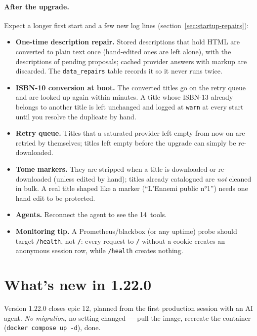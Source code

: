 \paragraph{After the upgrade.} Expect a longer first start and a few
new log lines (section~\ref{sec:startup-repairs}):
\begin{itemize}
  \item \textbf{One-time description repair.} Stored descriptions that
        hold HTML are converted to plain text once (hand-edited ones are
        left alone), with the descriptions of pending proposals; cached
        provider answers with markup are discarded. The
        \texttt{data\_repairs} table records it so it never runs twice.
  \item \textbf{ISBN-10 conversion at boot.} The converted titles go on
        the retry queue and are looked up again within minutes. A title
        whose ISBN-13 already belongs to another title is left unchanged
        and logged at \texttt{warn} at every start until you resolve the
        duplicate by hand.
  \item \textbf{Retry queue.} Titles that a saturated provider left
        empty from now on are retried by themselves; titles left empty
        before the upgrade can simply be re-downloaded.
  \item \textbf{Tome markers.} They are stripped when a title is
        downloaded or re-downloaded (unless edited by hand); titles
        already catalogued are \emph{not} cleaned in bulk. A real title
        shaped like a marker (``L'Ennemi public n°1'') needs one hand
        edit to be protected.
  \item \textbf{Agents.} Reconnect the agent to see the 14~tools.
  \item \textbf{Monitoring tip.} A Prometheus/blackbox (or any uptime)
        probe should target \texttt{/health}, not \texttt{/}: every
        request to \texttt{/} without a cookie creates an anonymous
        session row, while \texttt{/health} creates nothing.
\end{itemize}

\section{What's new in 1.22.0}\label{sec:whats-new-1.22.0}

Version 1.22.0 closes epic 12, planned from the first production
session with an AI agent. \emph{No migration}, no setting changed ---
pull the image, recreate the container (\texttt{docker compose up -d}),
done.

